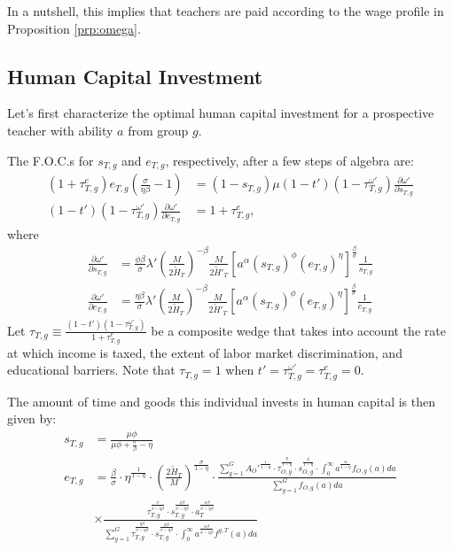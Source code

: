\documentclass[onehalfspacing,11pt]{article}
\begin{document}
	In a nutshell, this implies that teachers are paid according to the wage profile in Proposition \ref{prp:omega}.
	\subsection{Human Capital Investment}
	Let's first characterize the optimal human capital investment for a prospective teacher with ability $a$ from group $g$.%
	
	The F.O.C.s for $s_{T,g}$ and $e_{T,g}$, respectively, after a few steps of algebra are:
	\begin{align}
		\label{eq:foc-e}
		(1+\tau^e_{T,g}) e_{T,g} \left( \frac{\sigma}{\eta\beta }-1 \right) & = \left(1-s_{T,g}\right) \mu(1-t')(1-\tau^{\omega '}_{T,g}) \frac{\partial \omega'}{\partial s_{T,g}} \\
		\label{eq:foc-s}
		(1-t')(1-\tau^{\omega '}_{T,g}) \frac{\partial \omega'}{\partial e_{T,g}} & = 1+\tau^e_{T,g},
	\end{align}
	where
	\begin{align}
		\frac{\partial \omega'}{\partial s_{T,g}} & =  \frac{\phi\beta }{\sigma} \lambda' \left(\frac{M}{2 \widetilde{H}_T}\right)^{-\beta} \frac{M}{2 {\widetilde{H}'_T}} \left[ a^\alpha (s_{T,g})^\phi (e_{T,g})^\eta \right]^{\frac{\beta}{\sigma}} \frac{1}{s_{T,g}} \label{eq:sT} \\
		\frac{\partial \omega'}{\partial e_{T,g}} & = \frac{\eta\beta }{\sigma} \lambda' \left(\frac{M}{2 \widetilde{H}_T}\right)^{-\beta} \frac{M}{2 {\widetilde{H}'_T}} \left[ a^\alpha (s_{T,g})^\phi (e_{T,g})^\eta \right]^{\frac{\beta}{\sigma}} \frac{1}{e_{T,g}} \label{eq:eT}
	\end{align}
	Let $\tau_{T,g} \equiv \frac{\left( 1-t' \right) \left( 1-\tau^{\omega '}_{T,g} \right)}{1+\tau^e_{T,g}}$ be a composite wedge that takes into account the rate at which income is taxed, the extent of labor market discrimination, and educational barriers. Note that $\tau_{T,g}=1$ when $t' = \tau^{\omega '}_{T,g} = \tau^e_{T,g} = 0$.
	
	The amount of time and goods this individual invests in human capital is then given by:
	\begin{align}
		\label{app_eq:s_T}
		s_{T,g} & = \frac{\mu \phi}{\mu \phi+\tfrac{\sigma}{\beta}-\eta} \\
		\label{app_eq:e_T}
		e_{T,g} & = \tfrac{\beta}{\sigma}\cdot\eta^{\frac{1}{1-\eta}}\cdot \left(\tfrac{2\widetilde{H}_T}{M}\right)^{\frac{\sigma}{1-\eta}} \cdot \frac{\sum_{g=1}^G {A_O'}^\frac{1}{1-\eta}\cdot\tau_{O,g}^\frac{\eta}{1-\eta} \cdot s_{O,g}^\frac{\phi}{1-\eta}\cdot \int_0^\infty a^{\frac{\alpha}{1-\eta}} f_{O,g}(a)da}{\sum_{g=1}^G f_{O,g}(a)da} \nonumber\\
		& \times \frac{\tau_{T,g}^\frac{\sigma}{\sigma-\eta\beta } \cdot s_{T,g}^\frac{\phi\beta }{\sigma-\eta\beta } \cdot a_T^\frac{\alpha\beta }{\sigma-\eta\beta}}{\sum_{g=1}^G \tau_{T,g}^\frac{\eta\beta }{\sigma-\eta\beta } \cdot s_{T,g}^\frac{\phi\beta }{\sigma-\eta\beta } \cdot \int_0^\infty a^\frac{\alpha\beta}{\sigma-\eta\beta } f^{g,T}(a)da}
	\end{align}
	
\end{document}
